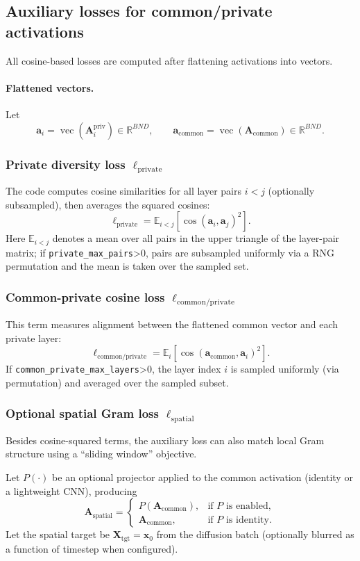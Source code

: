 \documentclass[11pt]{article}
\newcommand{\E}{\mathbb{E}}
\newcommand{\vecv}{\operatorname{vec}}
\begin{document}
\subsection*{Auxiliary losses for common/private activations}
All cosine-based losses are computed after flattening activations into vectors.
\paragraph{Flattened vectors.}
Let
\[
  \bm{a}_i = \vecv\!\left(\bm{A}_i^{\text{priv}}\right)\in\mathbb{R}^{BN D},
  \qquad
  \bm{a}_{\text{common}}=\vecv(\bm{A}_{\text{common}})\in\mathbb{R}^{BN D}.
  \]

\subsubsection*{Private diversity loss $\ell_{\text{private}}$}
The code computes cosine similarities for all layer pairs $i<j$ (optionally subsampled), then averages the squared cosines:
\[
  \ell_{\text{private}}
  = \E_{i<j}\left[\cos\!\left(\bm{a}_i,\bm{a}_j\right)^2\right].
 \]
Here $\E_{i<j}$ denotes a mean over all pairs in the upper triangle of the layer-pair matrix; if \texttt{private\_max\_pairs}>0, pairs are subsampled uniformly via a RNG permutation and the mean is taken over the sampled set.

\subsubsection*{Common-private cosine loss $\ell_{\text{common/private}}$}
This term measures alignment between the flattened common vector and each private layer:
\[
  \ell_{\text{common/private}}
  = \E_{i}\left[\cos\!\left(\bm{a}_{\text{common}},\bm{a}_i\right)^2\right].
  \]
If \texttt{common\_private\_max\_layers}>0, the layer index $i$ is sampled uniformly (via permutation) and averaged over the sampled subset.

\subsubsection*{Optional spatial Gram loss $\ell_{\text{spatial}}$}
Besides cosine-squared terms, the auxiliary loss can also match local Gram structure using a ``sliding window'' objective.

Let $P(\cdot)$ be an optional projector applied to the common activation (identity or a lightweight CNN), producing
\[
  \bm{A}_{\text{spatial}} = 
  \begin{cases}
    P(\bm{A}_{\text{common}}), & \text{if }P\text{ is enabled},\\
    \bm{A}_{\text{common}}, & \text{if }P\text{ is identity}.
  \end{cases}
  \]
Let the spatial target be $\bm{X}_{\text{tgt}}=\bm{x}_0$ from the diffusion batch (optionally blurred as a function of timestep when configured).
\end{document}
